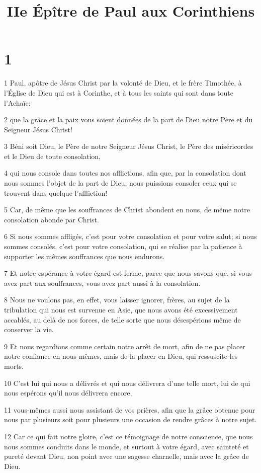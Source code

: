 

\title{IIe Épître de Paul aux Corinthiens}


\chapter{1}

\par 1 Paul, apôtre de Jésus Christ par la volonté de Dieu, et le frère Timothée, à l'Église de Dieu qui est à Corinthe, et à tous les saints qui sont dans toute l'Achaïe:
\par 2 que la grâce et la paix vous soient données de la part de Dieu notre Père et du Seigneur Jésus Christ!
\par 3 Béni soit Dieu, le Père de notre Seigneur Jésus Christ, le Père des miséricordes et le Dieu de toute consolation,
\par 4 qui nous console dans toutes nos afflictions, afin que, par la consolation dont nous sommes l'objet de la part de Dieu, nous puissions consoler ceux qui se trouvent dans quelque l'affliction!
\par 5 Car, de même que les souffrances de Christ abondent en nous, de même notre consolation abonde par Christ.
\par 6 Si nous sommes affligés, c'est pour votre consolation et pour votre salut; si nous sommes consolés, c'est pour votre consolation, qui se réalise par la patience à supporter les mêmes souffrances que nous endurons.
\par 7 Et notre espérance à votre égard est ferme, parce que nous savons que, si vous avez part aux souffrances, vous avez part aussi à la consolation.
\par 8 Nous ne voulons pas, en effet, vous laisser ignorer, frères, au sujet de la tribulation qui nous est survenue en Asie, que nous avons été excessivement accablés, au delà de nos forces, de telle sorte que nous désespérions même de conserver la vie.
\par 9 Et nous regardions comme certain notre arrêt de mort, afin de ne pas placer notre confiance en nous-mêmes, mais de la placer en Dieu, qui ressuscite les morts.
\par 10 C'est lui qui nous a délivrés et qui nous délivrera d'une telle mort, lui de qui nous espérons qu'il nous délivrera encore,
\par 11 vous-mêmes aussi nous assistant de vos prières, afin que la grâce obtenue pour nous par plusieurs soit pour plusieurs une occasion de rendre grâces à notre sujet.
\par 12 Car ce qui fait notre gloire, c'est ce témoignage de notre conscience, que nous nous sommes conduits dans le monde, et surtout à votre égard, avec sainteté et pureté devant Dieu, non point avec une sagesse charnelle, mais avec la grâce de Dieu.
